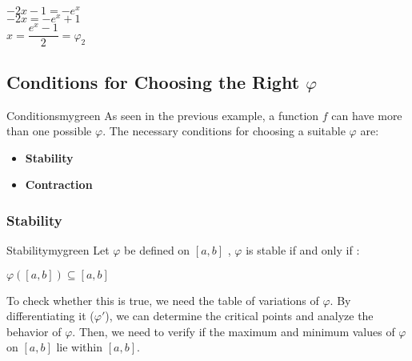 \vspace{0.25cm}

\begin{center}
    \(-2x - 1 = -e^{x}\)\\[0.1cm]
    \(-2x = -e^{x} + 1\)\\[0.1cm]
    \(\boxed{x = \dfrac{e^{x} - 1}{2} = \varphi_{2}}\)
\end{center}

\vspace{0.75cm}
\subsection{Conditions for Choosing the Right \(\varphi\)}
\begin{prettyBox}{Conditions}{mygreen}
As seen in the previous example, a function \( f \) can have more than one
possible \(\varphi\). The necessary conditions for choosing a suitable 
\(\varphi\) are:  
\begin{itemize}
    \item \textbf{Stability}
    \item \textbf{Contraction}
\end{itemize}
\end{prettyBox}

\vspace{0.6cm}
\subsubsection{Stability}
\begin{prettyBox}{Stability}{mygreen}
Let \(\varphi\) be defined on \([a, b]\) , \(\varphi\) is stable if and only if :
\begin{center}
    \(\varphi([a, b]) \subseteq [a, b]\)
\end{center}

\vspace{0.1cm}
To check whether this is true, we need the table of variations of \(\varphi\). 
By differentiating it (\(\varphi'\)), we can determine the critical points and
analyze the behavior of \(\varphi\). 
Then, we need to verify if the maximum and minimum values of \(\varphi\) on 
\([a, b]\) lie within \([a, b]\).
\end{prettyBox}

\vspace{0.5cm}
